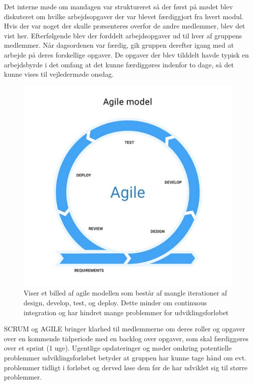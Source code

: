 Det interne møde om mandagen var struktureret så der først på mødet blev diskuteret om hvilke arbejdsopgaver der var blevet færdiggjort fra hvert modul. Hvis der var noget der skulle præsenteres overfor de andre medlemmer, blev det vist her. Efterfølgende blev der forddelt arbejdsopgaver ud til hver af gruppens medlemmer. Når dagsordenen var færdig, gik gruppen derefter igang med at arbejde på deres forskellige opgaver. De opgaver der blev tilddelt havde typisk en arbejdsbyrde i det omfang at det kunne færdiggøres indenfor to dage, så det kunne vises til vejledermøde onsdag.

\begin{figure}[H]
  \centering
  \includegraphics[scale=.5]{02-Body/Images/Agile.png}
  \caption{Viser et billed af agile modellen som består af mangle iterationer
           af design, develop, test, og deploy. Dette minder om continuous integration
           og har hindret mange problemmer for udviklingsforløbet}
  \label{fig:Agile}
\end{figure}

SCRUM og AGILE bringer klarhed til medlemmerne om deres roller og opgaver over en 
kommende tidperiode med en backlog over opgaver, som skal færdiggøres over et sprint (1 uge).
Ugentlige opdateringer og møder omkring potentielle problemmer udviklingsforløbet betyder
at gruppen har kunne tage hånd om evt. problemmer tidligt i forløbet og derved løse dem
før de har udviklet sig til større problemmer.

